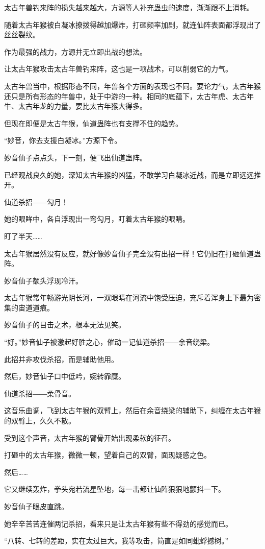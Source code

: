 \begin{this_body}
太古年兽钓来阵的损失越来越大，方源等人补充蛊虫的速度，渐渐跟不上消耗。

随着太古年猴被白凝冰撩拨得越加爆炸，打砸频率加剧，就连仙阵表面都浮现出了丝丝裂纹。

作为最强的战力，方源并无立即出战的想法。

让太古年猴攻击太古年兽钓来阵，这也是一项战术，可以削弱它的力气。

太古年兽当中，根据形态不同，年兽各个方面的表现也不同。要论力气，太古年猴还只是所有形态的年兽中，处于中游的一种。相同的底蕴下，太古年虎、太古年牛、太古年龙的力量，要比太古年猴大得多。

但现在即便是太古年猴，仙道蛊阵也有支撑不住的趋势。

“妙音，你去支援白凝冰。”方源下令。

妙音仙子点点头，下一刻，便飞出仙道蛊阵。

已经观战良久的她，深知太古年猴的凶猛，不敢学习白凝冰近战，而是立即远远推开。

仙道杀招――勾月！

她的眼眸中，各自浮现出一弯勾月，盯着太古年猴的眼睛。

盯了半天……

太古年猴居然没有反应，就好像妙音仙子完全没有出招一样！它仍旧在打砸仙道蛊阵。

妙音仙子额头浮现冷汗。

太古年猴常年畅游光阴长河，一双眼睛在河流中饱受压迫，充斥着浑身上下最为密集的宙道道痕。

妙音仙子的目击之术，根本无法见笑。

“好。”妙音仙子被激起好胜之心，催动一记仙道杀招――余音绕梁。

此招并非攻伐杀招，而是辅助他用。

然后，妙音仙子口中低吟，婉转霏糜。

仙道杀招――柔骨音。

这音乐曲调，飞到太古年猴的双臂上，然后在余音绕梁的辅助下，纠缠在太古年猴的双臂上，久久不散。

受到这个声音，太古年猴的臂骨开始出现柔软的征召。

打砸中的太古年猴，微微一顿，望着自己的双臂，面现疑惑之色。

然后……

它又继续轰炸，拳头宛若流星坠地，每一击都让仙阵狠狠地颤抖一下。

妙音仙子眼皮直跳。

她辛辛苦苦连催两记杀招，看来只是让太古年猴有些不得劲的感觉而已。

“八转、七转的差距，实在太过巨大。我等攻击，简直是如同蚍蜉撼树。”


\end{this_body}
